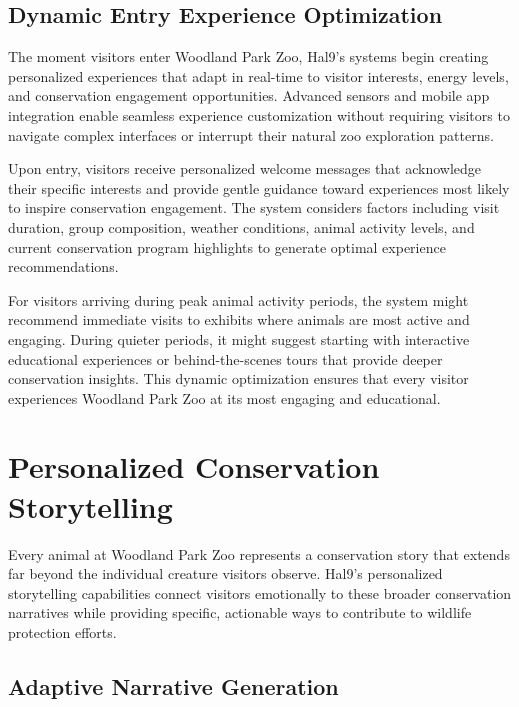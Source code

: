 \documentclass[
  Letterpaper,
]{scrbook}
\begin{document}
\subsection{Dynamic Entry Experience
Optimization}\label{dynamic-entry-experience-optimization}

The moment visitors enter Woodland Park Zoo, Hal9's systems begin
creating personalized experiences that adapt in real-time to visitor
interests, energy levels, and conservation engagement opportunities.
Advanced sensors and mobile app integration enable seamless experience
customization without requiring visitors to navigate complex interfaces
or interrupt their natural zoo exploration patterns.

Upon entry, visitors receive personalized welcome messages that
acknowledge their specific interests and provide gentle guidance toward
experiences most likely to inspire conservation engagement. The system
considers factors including visit duration, group composition, weather
conditions, animal activity levels, and current conservation program
highlights to generate optimal experience recommendations.

For visitors arriving during peak animal activity periods, the system
might recommend immediate visits to exhibits where animals are most
active and engaging. During quieter periods, it might suggest starting
with interactive educational experiences or behind-the-scenes tours that
provide deeper conservation insights. This dynamic optimization ensures
that every visitor experiences Woodland Park Zoo at its most engaging
and educational.

\section{Personalized Conservation
Storytelling}\label{personalized-conservation-storytelling-1}

Every animal at Woodland Park Zoo represents a conservation story that
extends far beyond the individual creature visitors observe. Hal9's
personalized storytelling capabilities connect visitors emotionally to
these broader conservation narratives while providing specific,
actionable ways to contribute to wildlife protection efforts.

\subsection{Adaptive Narrative
Generation}\label{adaptive-narrative-generation}
\end{document}

